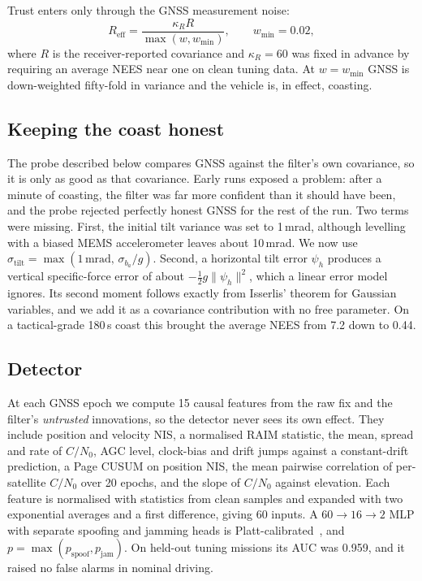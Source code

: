\documentclass[conference]{IEEEtran}
\begin{document}
Trust enters only through the GNSS measurement noise:
\begin{equation}
R_{\text{eff}} = \frac{\kappa_R R}{\max(w, w_{\min})}, \qquad w_{\min}=0.02,
\end{equation}
where $R$ is the receiver-reported covariance and $\kappa_R=60$ was fixed in advance by requiring an average NEES near one on clean tuning data. At $w=w_{\min}$ GNSS is down-weighted fifty-fold in variance and the vehicle is, in effect, coasting.

\subsection{Keeping the coast honest}
The probe described below compares GNSS against the filter's own covariance, so it is only as good as that covariance. Early runs exposed a problem: after a minute of coasting, the filter was far more confident than it should have been, and the probe rejected perfectly honest GNSS for the rest of the run. Two terms were missing. First, the initial tilt variance was set to 1\,mrad, although levelling with a biased MEMS accelerometer leaves about 10\,mrad. We now use $\sigma_{\text{tilt}} = \max(1\,\text{mrad},\, \sigma_{b_a}/g)$. Second, a horizontal tilt error $\psi_h$ produces a vertical specific-force error of about $-\tfrac12 g\lVert\psi_h\rVert^2$, which a linear error model ignores. Its second moment follows exactly from Isserlis' theorem for Gaussian variables, and we add it as a covariance contribution with no free parameter. On a tactical-grade 180\,s coast this brought the average NEES from 7.2 down to 0.44.

\subsection{Detector}
At each GNSS epoch we compute 15 causal features from the raw fix and the filter's \emph{untrusted} innovations, so the detector never sees its own effect. They include position and velocity NIS, a normalised RAIM statistic, the mean, spread and rate of $C/N_0$, AGC level, clock-bias and drift jumps against a constant-drift prediction, a Page CUSUM on position NIS, the mean pairwise correlation of per-satellite $C/N_0$ over 20 epochs, and the slope of $C/N_0$ against elevation. Each feature is normalised with statistics from clean samples and expanded with two exponential averages and a first difference, giving 60 inputs. A $60\!\to\!16\!\to\!2$ MLP with separate spoofing and jamming heads is Platt-calibrated~\cite{guo2017calibration}, and $p=\max(p_{\text{spoof}},p_{\text{jam}})$. On held-out tuning missions its AUC was 0.959, and it raised no false alarms in nominal driving.
\end{document}
